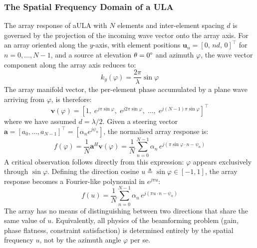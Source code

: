 \subsubsection{The Spatial Frequency Domain of a ULA}

The array response of a\gls{ULA} with $N$ elements and inter-element spacing $d$ is governed by the projection of the incoming wave vector onto the array axis. For an array oriented along the $y$-axis, with element positions $\mathbf{u}_n = [0,\, nd,\, 0]^\top$ for $n = 0, \ldots, N-1$, and a source at elevation $\theta = 0\degree $ and azimuth $\varphi$, the wave vector component along the array axis reduces to:
\begin{equation}
    k_y(\varphi) = \frac{2\pi}{\lambda}\sin\varphi
\end{equation}
The array manifold vector, the per-element phase accumulated by a plane wave arriving from $\varphi$, is therefore:
\begin{equation}
    \mathbf{v}(\varphi) = \left[1,\; e^{j\pi\sin\varphi},\; e^{j2\pi\sin\varphi},\; \ldots,\; e^{j(N-1)\pi\sin\varphi}\right]^\top
\end{equation}
where we have assumed $d = \lambda/2$. Given a steering vector $\mathbf{a} = [a_0, \ldots, a_{N-1}]^\top = [\alpha_n e^{j\psi_n}]$, the normalised array response is:
\begin{equation}
    f(\varphi) = \frac{1}{N}\mathbf{a}^H \mathbf{v}(\varphi) = \frac{1}{N}\sum_{n=0}^{N-1} \alpha_n\, e^{j(\pi\sin\varphi \cdot n - \psi_n)}
\end{equation}
A critical observation follows directly from this expression: $\varphi$ appears exclusively through $\sin\varphi$. Defining the direction cosine $u \triangleq \sin\varphi \in [-1, 1]$, the array response becomes a Fourier-like polynomial in $e^{j\pi u}$:
\begin{equation}
    f(u) = \frac{1}{N}\sum_{n=0}^{N-1} \alpha_n\, e^{j(\pi u \cdot n - \psi_n)}
\end{equation}
The array has no means of distinguishing between two directions that share the same value of $u$. Equivalently, all physics of the beamforming problem (gain, phase flatness, constraint satisfaction) is determined entirely by the spatial frequency $u$, not by the azimuth angle $\varphi$ per se.
